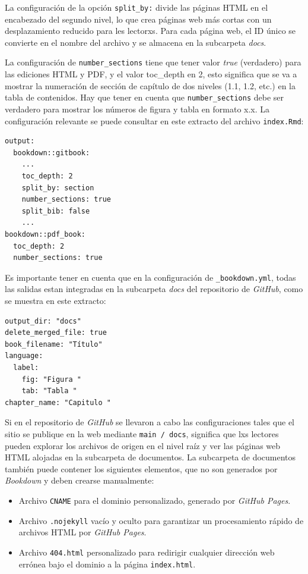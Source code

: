\documentclass[
]{book}
\begin{document}
La configuración de la opción \texttt{split\_by:} divide las páginas HTML en el encabezado del segundo nivel, lo que crea páginas web más cortas con un desplazamiento reducido para les lectorxs. Para cada página web, el ID único se convierte en el nombre del archivo y se almacena en la subcarpeta \emph{docs}.

La configuración de \texttt{number\_sections} tiene que tener valor \emph{true} (verdadero) para las ediciones HTML y PDF, y el valor toc\_depth en 2, esto significa que se va a mostrar la numeración de sección de capítulo de dos niveles (1.1, 1.2, etc.) en la tabla de contenidos. Hay que tener en cuenta que \texttt{number\_sections} debe ser verdadero para mostrar los números de figura y tabla en formato x.x. La configuración relevante se puede consultar en este extracto del archivo \texttt{index.Rmd}:

\begin{verbatim}
output:
  bookdown::gitbook:
    ...
    toc_depth: 2
    split_by: section
    number_sections: true
    split_bib: false
    ...
bookdown::pdf_book:
  toc_depth: 2
  number_sections: true
\end{verbatim}

Es importante tener en cuenta que en la configuración de \texttt{\_bookdown.yml}, todas las salidas estan integradas en la subcarpeta \emph{docs} del repositorio de \emph{GitHub}, como se muestra en este extracto:

\begin{verbatim}
output_dir: "docs"
delete_merged_file: true
book_filename: "Título"
language:
  label:
    fig: "Figura "
    tab: "Tabla "
chapter_name: "Capitulo "
\end{verbatim}

Si en el repositorio de \emph{GitHub} se llevaron a cabo las configuraciones tales que el sitio se publique en la web mediante \texttt{main\ /\ docs}, significa que lxs lectores pueden explorar los archivos de origen en el nivel raíz y ver las páginas web HTML alojadas en la subcarpeta de documentos. La subcarpeta de documentos también puede contener los siguientes elementos, que no son generados por \emph{Bookdown} y deben crearse manualmente:

\begin{itemize}
\item
  Archivo \texttt{CNAME} para el dominio personalizado, generado por \emph{GitHub Pages}.
\item
  Archivo \texttt{.nojekyll} vacío y oculto para garantizar un procesamiento rápido de archivos HTML por \emph{GitHub Pages}.
\item
  Archivo \texttt{404.html} personalizado para redirigir cualquier dirección web errónea bajo el dominio a la página \texttt{index.html}.
\end{itemize}
\end{document}
